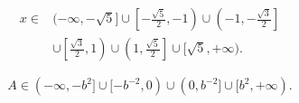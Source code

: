 \begin{answerkeybox}[Задание 8]
  \[
    \begin{aligned}
      x\in{}&(-\infty,-\sqrt5]
      \cup\left[-\frac{\sqrt5}{2},-1\right)
      \cup\left(-1,-\frac{\sqrt3}{2}\right]\\
      &\cup\left[\frac{\sqrt3}{2},1\right)
      \cup\left(1,\frac{\sqrt5}{2}\right]
      \cup[\sqrt5,+\infty).
    \end{aligned}
  \]
\end{answerkeybox}

\begin{answerkeybox}[Задание 9]
  \[
    A\in(-\infty,-b^2]
    \cup[-b^{-2},0)
    \cup(0,b^{-2}]
    \cup[b^2,+\infty).
  \]
\end{answerkeybox}
